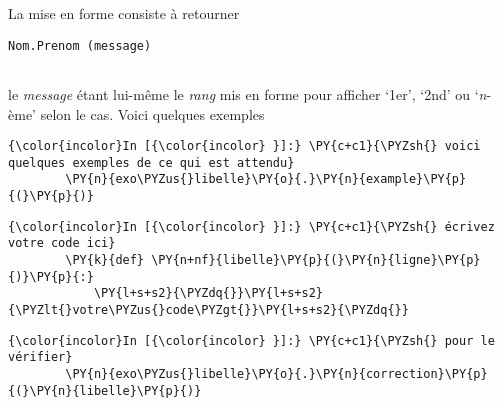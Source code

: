    La mise en forme consiste à retourner

\begin{verbatim}
Nom.Prenom (message)
 
\end{verbatim}

le \emph{message} étant lui-même le \emph{rang} mis en forme pour
afficher `1er', `2nd' ou `\emph{n}-ème' selon le cas. Voici quelques
exemples

    \begin{Verbatim}[commandchars=\\\{\}]
{\color{incolor}In [{\color{incolor} }]:} \PY{c+c1}{\PYZsh{} voici quelques exemples de ce qui est attendu}
        \PY{n}{exo\PYZus{}libelle}\PY{o}{.}\PY{n}{example}\PY{p}{(}\PY{p}{)}
\end{Verbatim}


    \begin{Verbatim}[commandchars=\\\{\}]
{\color{incolor}In [{\color{incolor} }]:} \PY{c+c1}{\PYZsh{} écrivez votre code ici}
        \PY{k}{def} \PY{n+nf}{libelle}\PY{p}{(}\PY{n}{ligne}\PY{p}{)}\PY{p}{:}
            \PY{l+s+s2}{\PYZdq{}}\PY{l+s+s2}{\PYZlt{}votre\PYZus{}code\PYZgt{}}\PY{l+s+s2}{\PYZdq{}}
\end{Verbatim}


    \begin{Verbatim}[commandchars=\\\{\}]
{\color{incolor}In [{\color{incolor} }]:} \PY{c+c1}{\PYZsh{} pour le vérifier}
        \PY{n}{exo\PYZus{}libelle}\PY{o}{.}\PY{n}{correction}\PY{p}{(}\PY{n}{libelle}\PY{p}{)}
\end{Verbatim}